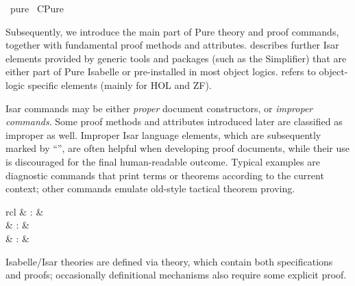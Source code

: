%
\begin{isabellebody}%
\def\isabellecontext{pure}%
%
\isadelimtheory
\isanewline
\isanewline
%
\endisadelimtheory
%
\isatagtheory
{}\isamarkupfalse%
\ pure\isanewline
{}\ CPure\isanewline
{}%
\endisatagtheory
{\isafoldtheory}%
%
\isadelimtheory
%
\endisadelimtheory
%
\isamarkuptrue%
%
\begin{isamarkuptext}%
Subsequently, we introduce the main part of Pure theory and proof
  commands, together with fundamental proof methods and attributes.
   describes further Isar elements provided by
  generic tools and packages (such as the Simplifier) that are either
  part of Pure Isabelle or pre-installed in most object logics.
   refers to object-logic specific elements (mainly
  for HOL and ZF).

  \medskip Isar commands may be either \emph{proper} document
  constructors, or \emph{improper commands}.  Some proof methods and
  attributes introduced later are classified as improper as well.
  Improper Isar language elements, which are subsequently marked by
  ``\isa{\isactrlsup {\isacharasterisk}}'', are often helpful when developing proof
  documents, while their use is discouraged for the final
  human-readable outcome.  Typical examples are diagnostic commands
  that print terms or theorems according to the current context; other
  commands emulate old-style tactical theorem proving.%
\end{isamarkuptext}%
\isamarkuptrue%
%
\isamarkuptrue%
%
\isamarkuptrue%
%
\begin{isamarkuptext}%
\begin{matharray}{rcl}
     & : &  \\
     & : &  \\
     & : &  \\
  \end{matharray}

  Isabelle/Isar theories are defined via theory, which contain both
  specifications and proofs; occasionally definitional mechanisms also
  require some explicit proof.


\end{isamarkuptext}
\end{isabellebody}
